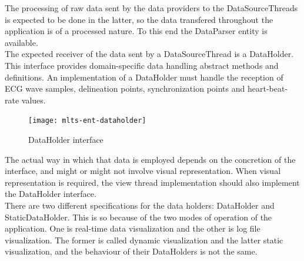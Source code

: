 		The processing of raw data sent by the data providers to the DataSourceThreads is expected to be done in the latter, so the data transfered throughout the application is of a processed nature. To this end the DataParser entity is available.\\

		The expected receiver of the data sent by a DataSourceThread is a DataHolder. This interface provides domain-specific data handling abstract methods and definitions. An implementation of a DataHolder must handle the reception of ECG wave samples, delineation points, synchronization points and heart-beat-rate values.\\

		\begin{figure}[h]
		\begin{center}
	    	\texttt{[image: mlts-ent-dataholder]}
  		\end{center}
  		\caption{DataHolder interface}
		\end{figure}

		The actual way in which that data is employed depends on the concretion of the interface, and might or might not involve visual representation. When visual representation is required, the view thread implementation should also implement the DataHolder interface.\\


		There are two different specifications for the data holders: DataHolder and StaticDataHolder. This is so because of the two modes of operation of the application. One is real-time data visualization and the other is log file visualization. The former is called dynamic visualization and the latter static visualization, and the behaviour of their DataHolders is not the same.\\

